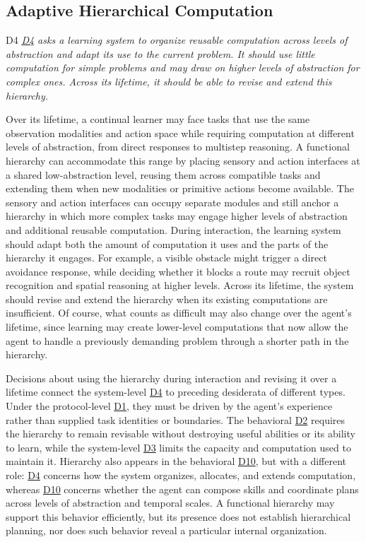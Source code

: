 \documentclass[10pt,journal,compsoc]{IEEEtran}
\DeclareRobustCommand{\Dref}[1]{\hyperref[sec:d#1]{D#1}}
\begin{document}
\subsection{Adaptive Hierarchical Computation}
\label{sec:d4}

\begin{briefbox}[systembrief]{D4}
    \emph{\Dref{4} asks a learning system to organize reusable computation across levels of abstraction and adapt its use to the current problem.
    It should use little computation for simple problems and may draw on higher levels of abstraction for complex ones.
    Across its lifetime, it should be able to revise and extend this hierarchy.}
\end{briefbox}

\noindent Over its lifetime, a continual learner may face tasks that use the same observation modalities and action space while requiring computation at different levels of abstraction, from direct responses to multistep reasoning.
A functional hierarchy can accommodate this range by placing sensory and action interfaces at a shared low-abstraction level, reusing them across compatible tasks and extending them when new modalities or primitive actions become available.
The sensory and action interfaces can occupy separate modules and still anchor a hierarchy in which more complex tasks may engage higher levels of abstraction and additional reusable computation.
During interaction, the learning system should adapt both the amount of computation it uses and the parts of the hierarchy it engages.
For example, a visible obstacle might trigger a direct avoidance response, while deciding whether it blocks a route may recruit object recognition and spatial reasoning at higher levels.
Across its lifetime, the system should revise and extend the hierarchy when its existing computations are insufficient.
Of course, what counts as difficult may also change over the agent's lifetime, since learning may create lower-level computations that now allow the agent to handle a previously demanding problem through a shorter path in the hierarchy.

Decisions about using the hierarchy during interaction and revising it over a lifetime connect the system-level \Dref{4} to preceding desiderata of different types.
Under the protocol-level \Dref{1}, they must be driven by the agent's experience rather than supplied task identities or boundaries.
The behavioral \Dref{2} requires the hierarchy to remain revisable without destroying useful abilities or its ability to learn, while the system-level \Dref{3} limits the capacity and computation used to maintain it.
Hierarchy also appears in the behavioral \Dref{10}, but with a different role:
\Dref{4} concerns how the system organizes, allocates, and extends computation, whereas \Dref{10} concerns whether the agent can compose skills and coordinate plans across levels of abstraction and temporal scales.
A functional hierarchy may support this behavior efficiently, but its presence does not establish hierarchical planning, nor does such behavior reveal a particular internal organization.
\end{document}
